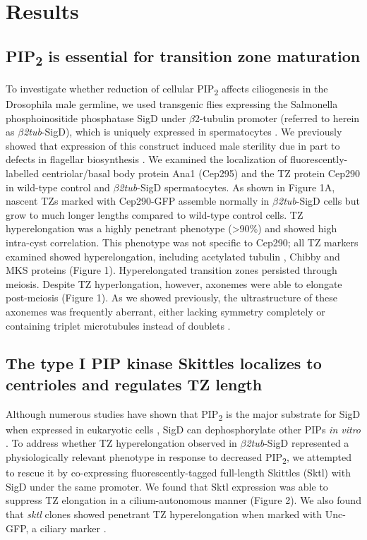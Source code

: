 \documentclass[12pt, twoside, letterpaper]{article}
\newcommand{\PIP}{PIP\textsubscript{2}}
\newcommand{\sigd}{$\beta$\textit{2tub}-SigD}
\begin{document}
\section{Results}

\subsection{\PIP{} is essential for transition zone maturation}
To investigate whether reduction of cellular \PIP{} affects ciliogenesis in the
Drosophila male germline,
we used transgenic flies expressing the Salmonella phosphoinositide phosphatase SigD
under $\beta$2-tubulin promoter (referred to herein as \sigd{}),
which is uniquely expressed in spermatocytes
\citep{wei2008depletion, fabian2010phosphatidylinositol}.
We previously showed that expression of this construct
induced male sterility due in part to defects in flagellar biosynthesis \citep{wei2008depletion}.
We examined the localization of fluorescently-labelled centriolar/basal body protein
Ana1 (Cep295) \citep{goshima2007genes, blachon2009proximal}
and the TZ protein Cep290 \citep{basiri2014migrating}
in wild-type control and \sigd{} spermatocytes.
As shown in Figure 1A, nascent TZs marked with Cep290-GFP assemble normally in \sigd{} cells
but grow to much longer lengths compared to wild-type control cells.
TZ hyperelongation was a highly penetrant phenotype (\textgreater 90\%)
and showed high intra-cyst correlation.
This phenotype was not specific to Cep290;
all TZ markers examined showed hyperelongation, including
acetylated tubulin \citep{gottardo2013cilium},
Chibby \citep{enjolras2012drosophila} and
MKS \citep{slaats2015mks1, vieillard2016transition} proteins (Figure 1).
Hyperelongated transition zones persisted through meiosis.
Despite TZ hyperlongation, however, axonemes were able to elongate post-meiosis (Figure 1).
As we showed previously, the ultrastructure of these axonemes was frequently aberrant,
either lacking symmetry completely or containing triplet microtubules instead of doublets
\citep{wei2008depletion}.


\subsection{The type I PIP kinase Skittles localizes to centrioles and regulates TZ length}
Although numerous studies have shown that \PIP{} is the major substrate for SigD
when expressed in eukaryotic cells
\citep{terebiznik2002elimination, zhou2001salmonella, sengupta2013depletion},
SigD can dephosphorylate other PIPs \textit{in vitro}
\citep{norris1998sopb}.
To address whether TZ hyperelongation observed in \sigd{} represented
a physiologically relevant phenotype in response to decreased \PIP{},
we attempted to rescue it by
co-expressing fluorescently-tagged full-length Skittles (Sktl) with SigD
under the same promoter.
We found that Sktl expression was able to suppress TZ elongation in a cilium-autonomous
manner (Figure 2).
We also found that \textit{sktl} clones showed penetrant TZ hyperelongation when
marked with Unc-GFP, a ciliary marker \citep{baker2004mechanosensory}.
\end{document}
